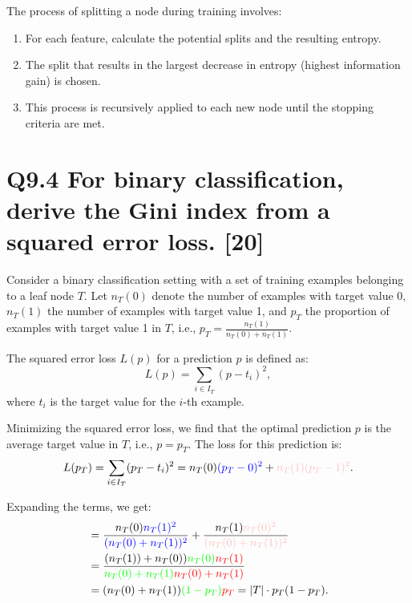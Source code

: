 \documentclass[11pt]{article}
\begin{document}
The process of splitting a node during training involves:

\begin{enumerate}
    \item For each feature, calculate the potential splits and the resulting entropy.
    \item The split that results in the largest decrease in entropy (highest information gain) is chosen.
    \item This process is recursively applied to each new node until the stopping criteria are met.
\end{enumerate}

\section{Q9.4 For binary classification, derive the Gini index from a squared error loss. [20]}


Consider a binary classification setting with a set of training examples belonging to a leaf node \( T \). Let \( n_T(0) \) denote the number of examples with target value 0, \( n_T(1) \) the number of examples with target value 1, and \( p_T \) the proportion of examples with target value 1 in \( T \), i.e., \( p_T = \frac{n_T(1)}{n_T(0) + n_T(1)} \).

The squared error loss \( L(p) \) for a prediction \( p \) is defined as:
\[
L(p) = \sum_{i \in I_T} (p - t_i)^2,
\]
where \( t_i \) is the target value for the \( i \)-th example.

Minimizing the squared error loss, we find that the optimal prediction \( p \) is the average target value in \( T \), i.e., \( p = p_T \). The loss for this prediction is:
\[
L(p_T) = \sum_{i \in I_T} (p_T - t_i)^2 = n_T(0)\textcolor{blue}{(p_T - 0)^2} + \textcolor{pink}{n_T(1)(p_T - 1)^2}.
\]

Expanding the terms, we get:
\begin{equation}
\begin{aligned}
&= \frac{n_T(0)\textcolor{blue}{n_T(1)^2}}{\textcolor{blue}{(n_T(0) + n_T(1))^2}} + \frac{n_T(1)\textcolor{pink}{n_T(0)^2}}{\textcolor{pink}{(n_T(0) + n_T(1))^2}} \\
&= \frac{{(n_T(1))} + {n_T(0))}\textcolor{green}{n_T(0)}\textcolor{red}{n_T(1)}}{\textcolor{green}{n_T(0) + n_T(1)}\textcolor{red}{n_T(0) + n_T(1)}}\\
&= ({n_T(0) + n_T(1)})\textcolor{green}{(1 - {p_T})}\textcolor{red}{p_T} = |T| \cdot p_T(1 - {p_T}).
\end{aligned}
\end{equation}
    
\end{document}
